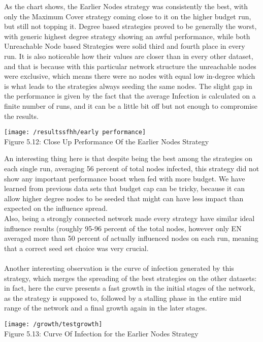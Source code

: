 As the chart shows, the Earlier Nodes strategy was consistently the best, with only the Maximum Cover strategy coming close to it on the higher budget run, but still not topping it. Degree based strategies proved to be generally the worst, with generic highest degree strategy showing an awful performance, while both Unreachable Node based Strategies were solid third and fourth place in every run. It is also noticeable how their values are closer than in every other dataset, and that is because with this particular network structure the unreachable nodes were exclusive, which means there were no nodes with equal low in-degree which is what leads to the strategies always seeding the same nodes. The slight gap in the performance is given by the fact that the average Infection is calculated on a finite number of runs, and it can be a little bit off but not enough to compromise the results. 


\begin{center}
    \texttt{[image: /resultssfhh/early performance]}
    \\
    Figure 5.12: Close Up Performance Of the Earlier Nodes Strategy
\end{center}

An interesting thing here is that despite being the best among the strategies on each single run, averaging 56 percent of total nodes infected, this strategy did not show any important performance boost when fed with more budget. We have learned from previous data sets that budget cap can be tricky, because it can allow higher degree nodes to be seeded that might can have less impact than expected on the influence spread.
\\
Also, being a strongly connected network made every strategy have similar ideal influence results (roughly 95-96 percent of the total nodes, however only EN averaged more than 50 percent of actually influenced nodes on each run, meaning that a correct seed set choice was very crucial. 
\\
\\
Another interesting observation is the curve of infection generated by this strategy, which merges the spreading of the best strategies on the other datasets: in fact, here the curve presents a fast growth in the initial stages of the network, as the strategy is supposed to, followed by a stalling phase in the entire mid range of the network and a final growth again in the later stages.

\begin{center}
    \texttt{[image: /growth/testgrowth]}
    \\
    Figure 5.13: Curve Of Infection for the Earlier Nodes Strategy
\end{center}

